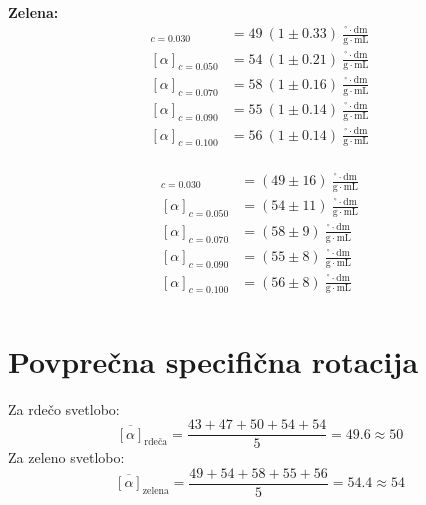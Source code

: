 \documentclass[a4paper,12pt]{article}
\begin{document}
\vspace{1em}

\begin{minipage}{0.48\textwidth}
\textbf{Zelena:}
\begin{align*}
[\alpha]_{c=0.030} &= 49 \ (1 \pm 0.33) \ \frac{^\circ \cdot \mathrm{dm}}{\mathrm{g} \cdot \mathrm{mL}} \\
[\alpha]_{c=0.050} &= 54 \ (1 \pm 0.21) \ \frac{^\circ \cdot \mathrm{dm}}{\mathrm{g} \cdot \mathrm{mL}} \\
[\alpha]_{c=0.070} &= 58 \ (1 \pm 0.16) \ \frac{^\circ \cdot \mathrm{dm}}{\mathrm{g} \cdot \mathrm{mL}} \\
[\alpha]_{c=0.090} &= 55 \ (1 \pm 0.14) \ \frac{^\circ \cdot \mathrm{dm}}{\mathrm{g} \cdot \mathrm{mL}} \\
[\alpha]_{c=0.100} &= 56 \ (1 \pm 0.14) \ \frac{^\circ \cdot \mathrm{dm}}{\mathrm{g} \cdot \mathrm{mL}} \\
\end{align*}
\end{minipage}
\hfill
\begin{minipage}{0.48\textwidth}

\begin{align*}
[\alpha]_{c=0.030} &= (49 \pm 16) \  \frac{^\circ \cdot \mathrm{dm}}{\mathrm{g} \cdot \mathrm{mL}} \\
[\alpha]_{c=0.050} &= (54 \pm 11) \  \frac{^\circ \cdot \mathrm{dm}}{\mathrm{g} \cdot \mathrm{mL}} \\
[\alpha]_{c=0.070} &= (58 \pm 9)  \ \frac{^\circ \cdot \mathrm{dm}}{\mathrm{g} \cdot \mathrm{mL}} \\
[\alpha]_{c=0.090} &= (55 \pm 8)  \ \frac{^\circ \cdot \mathrm{dm}}{\mathrm{g} \cdot \mathrm{mL}} \\
[\alpha]_{c=0.100} &= (56 \pm 8)  \ \frac{^\circ \cdot \mathrm{dm}}{\mathrm{g} \cdot \mathrm{mL}} \\
\end{align*}
\end{minipage}


\section*{Povprečna specifična rotacija}

Za rdečo svetlobo:
\[
\overline{[\alpha]}_{\text{rdeča}} = \frac{43 + 47 + 50 + 54 + 54}{5} = 49.6 \approx 50
\]
Za zeleno svetlobo:
\[
\overline{[\alpha]}_{\text{zelena}} = \frac{49 + 54 + 58 + 55 + 56}{5} = 54.4 \approx 54
\]
\end{document}
